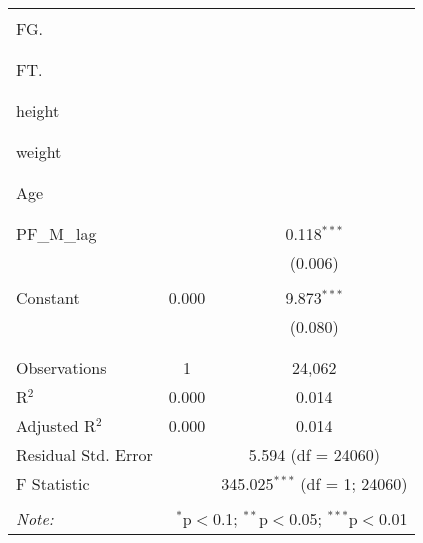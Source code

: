 \begin{table}[!htbp]
\begin{tabular}{@{\extracolsep{5pt}}lcc}
  & & \\ 
 FG. &  &  \\ 
  &  &  \\ 
  & & \\ 
 FT. &  &  \\ 
  &  &  \\ 
  & & \\ 
 height &  &  \\ 
  &  &  \\ 
  & & \\ 
 weight &  &  \\ 
  &  &  \\ 
  & & \\ 
 Age &  &  \\ 
  &  &  \\ 
  & & \\ 
 PF\_M\_lag &  & 0.118$^{***}$ \\ 
  &  & (0.006) \\ 
  & & \\ 
 Constant & 0.000 & 9.873$^{***}$ \\ 
  &  & (0.080) \\ 
  & & \\ 
\hline \\[-1.8ex] 
Observations & 1 & 24,062 \\ 
R$^{2}$ & 0.000 & 0.014 \\ 
Adjusted R$^{2}$ & 0.000 & 0.014 \\ 
Residual Std. Error &  & 5.594 (df = 24060) \\ 
F Statistic &  & 345.025$^{***}$ (df = 1; 24060) \\ 
\hline 
\hline \\[-1.8ex] 
\textit{Note:}  & \multicolumn{2}{r}{$^{*}$p$<$0.1; $^{**}$p$<$0.05; $^{***}$p$<$0.01} \\ 
\end{tabular} 
\end{table} 
